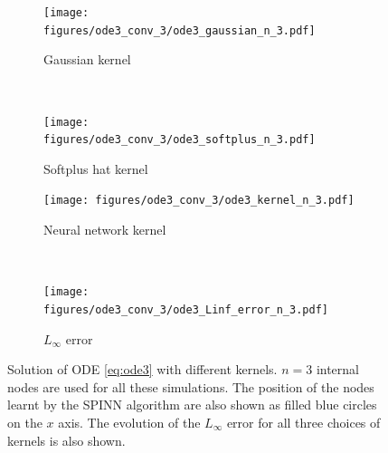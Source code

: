\documentclass[12pt]{article}
\begin{document}
\begin{figure}
\begin{subfigure}{0.48\textwidth}
\centering
\texttt{[image: figures/ode3\_conv\_3/ode3\_gaussian\_n\_3.pdf]}
\caption{Gaussian kernel}
\label{fig:ode3_gaussian_n_3}
\end{subfigure}
~
\begin{subfigure}{0.48\textwidth}
\centering
\texttt{[image: figures/ode3\_conv\_3/ode3\_softplus\_n\_3.pdf]}
\caption{Softplus hat kernel}
\label{fig:ode3_softplus_n_3}
\end{subfigure}

\begin{subfigure}{0.48\textwidth}
\centering
\texttt{[image: figures/ode3\_conv\_3/ode3\_kernel\_n\_3.pdf]}
\caption{Neural network kernel}
\label{fig:ode3_kernel_n_3}
\end{subfigure}
~
\begin{subfigure}{0.48\textwidth}
\centering
\texttt{[image: figures/ode3\_conv\_3/ode3\_Linf\_error\_n\_3.pdf]}
\caption{$L_{\infty}$ error}
\label{fig:ode3_Linf_n_3_full}
\end{subfigure}
\caption{Solution of ODE \eqref{eq:ode3} with different kernels. $n=3$ internal nodes are used for all these simulations. The position of the nodes learnt by the SPINN algorithm are also shown as filled blue circles on the $x$ axis.  The evolution of the $L_\infty$ error for all three choices of kernels is also shown.}
\label{fig:ode3_kernel_error}
\end{figure}
\end{document}
